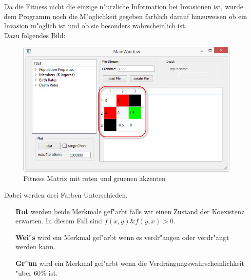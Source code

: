 \documentclass[11pt, a4paper, german]{article}
\theoremstyle{plain}
\begin{document}
	Da die Fitness nicht die einzige n"utzliche Information bei Invasionen ist, wurde dem Programm noch die M"oglichkeit gegeben farblich darauf hinzuweisen ob ein Invasion m"oglich ist und ob sie besonders wahrscheinlich ist.\\
	Dazu folgendes Bild:
	\begin{figure}[H]
		\centering
		\includegraphics[width=1\linewidth]{./Pictures/MainWindow_red_green_loaded}
		\caption[MainWindow_redGreenFitness]{Fitness Matrix mit roten und gruenen akzenten}
		\label{fig:MainWindow_red_green_loaded}
	\end{figure}
	Dabei werden drei Farben Unterschieden. 
	\begin{itemize}
		\item [\textbf{Rot}] werden beide Merkmale gef"arbt falls wir einen Zustand der Koexistenz erwarten. In diesem Fall sind $ f(x,y) \& f(y,x) > 0 $.
		\item [\textbf{Wei"s}] wird ein Merkmal gef"arbt wenn es verdr"angen oder verdr"angt werden kann.
		\item [\textbf{Gr"un}] wird ein Merkmal gef"arbt wenn die Verdrängungswahrscheinlichkeit "uber 60\% ist.
	\end{itemize}
\end{document}
